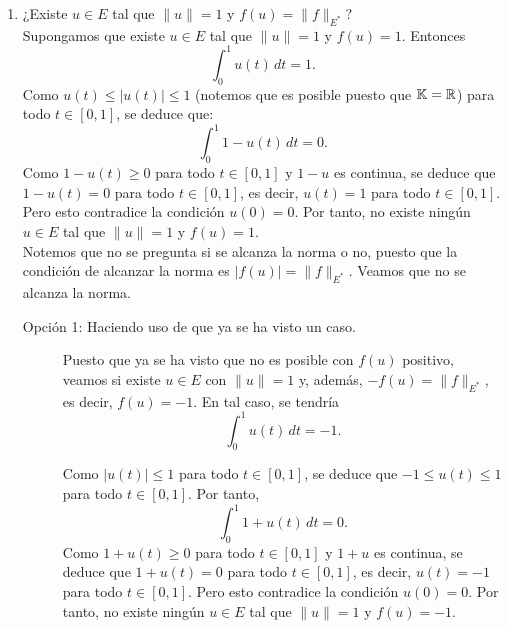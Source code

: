 \documentclass[12pt]{article}
\begin{document}
\begin{ejercicio}[2.5 puntos]
\begin{enumerate}[label=\alph*)]
            \item ¿Existe $u\in E$ tal que $\|u\| = 1$ y $f(u) = \|f\|_{E^\ast}$?\\
                Supongamos que existe $u\in E$ tal que $\|u\|=1$ y $f(u)=1$. Entonces
                \begin{equation*}
                \int_0^1 u(t)\,dt=1.
                \end{equation*}
                Como $u(t)\leq |u(t)|\le 1$ (notemos que es posible puesto que $\mathbb{K}=\mathbb{R}$) para todo $t\in[0,1]$, se deduce que:
                \begin{equation*}
                    \int_0^1 1-u(t)\,dt = 0.
                \end{equation*}
                Como $1-u(t)\ge 0$ para todo $t\in[0,1]$ y $1-u$ es continua, se deduce que $1-u(t)=0$ para todo $t\in[0,1]$, es decir, $u(t)=1$ para todo $t\in[0,1]$. Pero esto contradice la condición $u(0)=0$. Por tanto, no existe ningún $u\in E$ tal que $\|u\|=1$ y $f(u)=1$.\\

                Notemos que no se pregunta si se alcanza la norma o no, puesto que la condición de alcanzar la norma es $|f(u)|=\|f\|_{E^\ast}$. Veamos que no se alcanza la norma.
                \begin{description}
                    \item[Opción 1: Haciendo uso de que ya se ha visto un caso.]
                    
                    Puesto que ya se ha visto que no es posible con $f(u)$ positivo, veamos si existe $u\in E$ con $\|u\|=1$ y, además, $-f(u)=\|f\|_{E^\ast}$, es decir, $f(u)=-1$. En tal caso, se tendría
                    \begin{equation*}
                        \int_0^1 u(t)\,dt=-1.
                    \end{equation*}

                    Como $|u(t)|\le 1$ para todo $t\in[0,1]$, se deduce que $-1\le u(t)\le 1$ para todo $t\in[0,1]$. Por tanto,
                    \begin{equation*}
                        \int_0^1 1+u(t)\,dt = 0.
                    \end{equation*}
                    Como $1+u(t)\ge 0$ para todo $t\in[0,1]$ y $1+u$ es continua, se deduce que $1+u(t)=0$ para todo $t\in[0,1]$, es decir, $u(t)=-1$ para todo $t\in[0,1]$. Pero esto contradice la condición $u(0)=0$. Por tanto, no existe ningún $u\in E$ tal que $\|u\|=1$ y $f(u)=-1$.\\


\end{description}
\end{enumerate}
\end{ejercicio}
\end{document}
